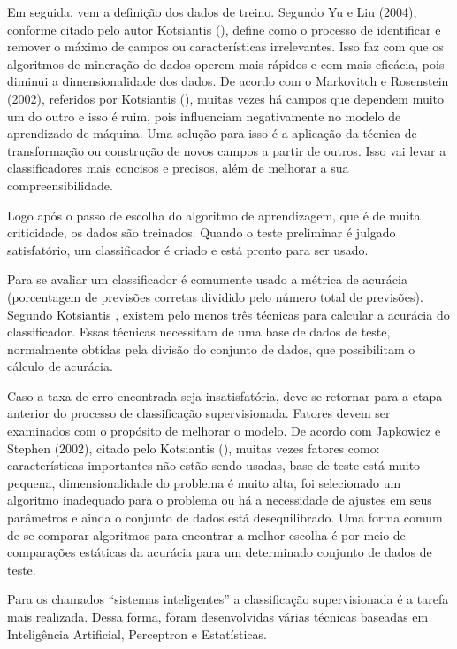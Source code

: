 Em seguida, vem a definição dos dados de treino. Segundo Yu e Liu (2004), conforme citado pelo autor Kotsiantis (\citeyear{Kotsiantis}), define como o processo de identificar e remover o máximo de campos ou características irrelevantes. Isso faz com que os algoritmos de mineração de dados operem mais rápidos e com mais eficácia, pois diminui a dimensionalidade dos dados. De acordo com o Markovitch e Rosenstein (2002), referidos por Kotsiantis (\citeyear{Kotsiantis}), muitas vezes há campos que dependem muito um do outro e isso é ruim, pois influenciam negativamente no modelo de aprendizado de máquina. Uma solução para isso é a aplicação da técnica de transformação ou construção de novos campos a partir de outros. Isso vai levar a classificadores mais concisos e precisos, além de melhorar a sua compreensibilidade.

Logo após o passo de escolha do algoritmo de aprendizagem, que é de muita criticidade, os dados são treinados. Quando o teste preliminar é julgado satisfatório, um classificador é criado e está pronto para ser usado.

Para se avaliar um classificador é comumente usado a métrica de acurácia (porcentagem de previsões corretas dividido pelo número total de previsões). Segundo Kotsiantis \citeyear{Kotsiantis}, existem pelo menos três técnicas para calcular a acurácia do classificador. Essas técnicas necessitam de uma base de dados de teste, normalmente obtidas pela divisão do conjunto de dados, que possibilitam o cálculo de acurácia.

Caso a taxa de erro encontrada seja insatisfatória, deve-se retornar para a etapa anterior do processo de classificação supervisionada. Fatores devem ser examinados com o propósito de melhorar o modelo. De acordo com Japkowicz e Stephen (2002), citado pelo Kotsiantis (\citeyear{Kotsiantis}), muitas vezes fatores como: características importantes não estão sendo usadas, base de teste está muito pequena, dimensionalidade do problema é muito alta, foi selecionado um algoritmo inadequado para o problema ou há a necessidade de ajustes em seus parâmetros e ainda o conjunto de dados está desequilibrado. Uma forma comum de se comparar algoritmos para encontrar a melhor escolha é por meio de comparações estáticas da acurácia para um determinado conjunto de dados de teste.

Para os chamados “sistemas inteligentes” a classificação supervisionada é a tarefa mais realizada. Dessa forma, foram desenvolvidas várias técnicas baseadas em Inteligência Artificial, Perceptron e Estatísticas.
	
